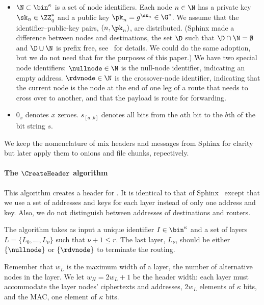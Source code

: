 \begin{itemize}
  \item \(\N\subset \bin^\kappa\) is a set of node identifiers.
    Each node \(n\in \N\) has a private key \(\sk_n\in \ZZ_q^*\) and a public 
    key \(\pk_n = g^{\sk_n}\in \G^*\).
    We assume that the identifier--public-key pairs, \((n, \pk_n)\), are 
    distributed.
    (Sphinx made a difference between nodes and destinations, \ie the set 
    \(\D\) such that \(\D\cap \N = \emptyset\) and \(\D\cup \N\) is prefix 
    free, see~\cite{Sphinx} for details.
    We could do the same adoption, but we do not need that for the purposes of 
    this paper.)
    We have two special node identifiers:
    \(\nullnode\in \N\) is the null-node identifier, indicating an empty 
    address.
    \(\rdvnode\in \N\) is the crossover-node identifier, indicating that the 
    current node is the node at the end of one leg of a route that needs to cross
   over to another, and that the payload is  route 
    for forwarding.

  \item \(0_x\) denotes \(x\) zeroes.
    \(s_{[a..b]}\) denotes all bits from the \(a\)th bit to the \(b\)th of the 
    bit string \(s\).
\end{itemize}

We keep the nomenclature of mix headers and messages from Sphinx for
clarity but later apply them to onions and file chunks, repectively.

\paragraph*{The \(\CreateHeader\) algorithm}

This algorithm creates a header for .
It is identical to that of Sphinx~\cite[\S 3.2]{Sphinx} except that we use a 
set of addresses and keys for each layer instead of only one address and key.
Also, we do not distinguish between addresses of destinations and routers.

The algorithm takes as input a unique identifier \(I\in \bin^\kappa\) and a set 
of layers \(L = \{L_0, \dotsc, L_\nu\}\) such that \(\nu+1\leq r\).
The last layer, \(L_\nu\), should be either \(\{\nullnode\}\) or 
\(\{\rdvnode\}\) to terminate the routing. 

Remember that \(w_L\) is the maximum width of a layer, \ie the number of 
alternative nodes in the layer.
We let \(w_H = 2w_L+1\) be the header width:
each layer must accommodate the layer nodes' ciphertexts and addresses, \ie  
\(2w_L\) elements of \(\kappa\) bits,
and the \ac{MAC}, \ie one element of \(\kappa\) bits.

